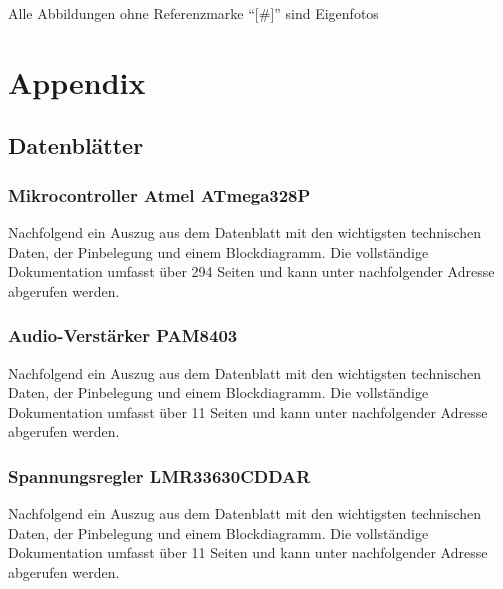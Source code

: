 \documentclass[a4paper, twoside, 12pt, openright]{memoir}
\newcommand{\AndreasGrain}{Andreas Grain}
\newcommand{\MatthiasMair}{Matthias Mair}
\newcommand{\authorName}{\AndreasGrain\ / \MatthiasMair}
\begin{document}
\renewcommand{\authorName}{\AndreasGrain\ / \MatthiasMair}
\appendix
\printbibliography[title={Literatur und Quellen}]\clearpage
\printacronyms[heading=chapter*,name=Abkürzungen]\clearpage
\listoffigures
Alle Abbildungen ohne Referenzmarke \enquote{[\#]} sind Eigenfotos\clearpage
\listoftables
\clearpage

\part{Appendix}
\chapter{Datenblätter}
\section{Mikrocontroller Atmel ATmega328P}
Nachfolgend ein Auszug aus dem Datenblatt mit den wichtigsten technischen Daten, der Pinbelegung und einem Blockdiagramm. Die vollständige Dokumentation umfasst über 294 Seiten und kann unter nachfolgender Adresse abgerufen werden.\par
{}
\section{Audio-Verstärker PAM8403}
Nachfolgend ein Auszug aus dem Datenblatt mit den wichtigsten technischen Daten, der Pinbelegung und einem Blockdiagramm. Die vollständige Dokumentation umfasst über 11 Seiten und kann unter nachfolgender Adresse abgerufen werden.\par
{}

\section{Spannungsregler LMR33630CDDAR}
Nachfolgend ein Auszug aus dem Datenblatt mit den wichtigsten technischen Daten, der Pinbelegung und einem Blockdiagramm. Die vollständige Dokumentation umfasst über 11 Seiten und kann unter nachfolgender Adresse abgerufen werden.\par
{}

\end{document}
